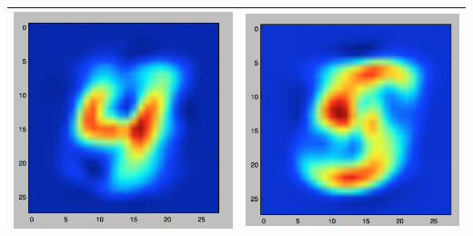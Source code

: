 \documentclass[11pt]{article}
\begin{document}
\begin{table}[!th]
\begin{tabular}{|c|c|}
\includegraphics[scale=.15]{images/bayes4.png} & \includegraphics[scale=.15]{images/bayes5.png} \\
\hline

\end{tabular}
\end{table}
\end{document}
